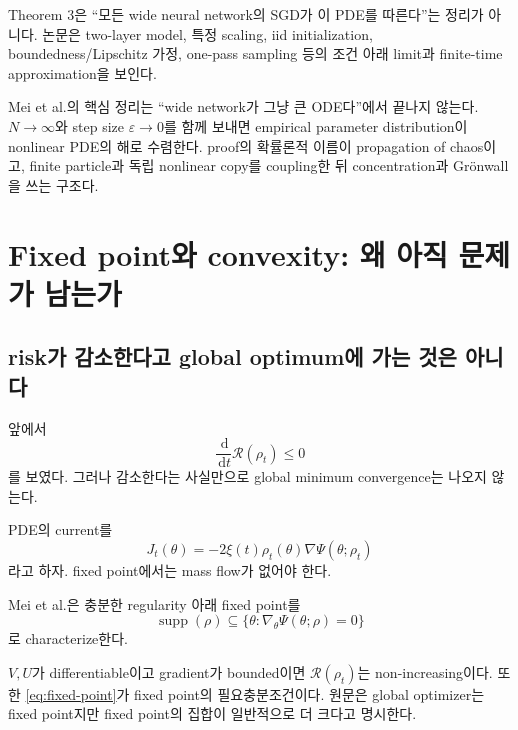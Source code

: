 \documentclass[11pt,a4paper,oneside,openany]{memoir}
\newcommand{\Risk}{\mathcal{R}}
\newcommand{\grad}{\nabla}
\newcommand{\dd}{\,\mathrm{d}}
\newcommand{\supp}{\operatorname{supp}}
\theoremstyle{definition}
\begin{document}
\begin{warningbox}
Theorem 3은 ``모든 wide neural network의 SGD가 이 PDE를 따른다''는 정리가 아니다.
논문은 two-layer model, 특정 scaling, iid initialization, boundedness/Lipschitz 가정, one-pass sampling 등의
조건 아래 limit과 finite-time approximation을 보인다.
\end{warningbox}

\begin{presentbox}
Mei et al.의 핵심 정리는 ``wide network가 그냥 큰 ODE다''에서 끝나지 않는다.
$N\to\infty$와 step size $\varepsilon\to0$를 함께 보내면 empirical parameter distribution이
nonlinear PDE의 해로 수렴한다. proof의 확률론적 이름이 propagation of chaos이고,
finite particle과 독립 nonlinear copy를 coupling한 뒤 concentration과 Grönwall을 쓰는 구조다.
\end{presentbox}

\chapter{Fixed point와 convexity: 왜 아직 문제가 남는가}

\section{risk가 감소한다고 global optimum에 가는 것은 아니다}

앞에서
\[
  \frac{\dd}{\dd t}\Risk(\rho_t)\le0
\]
를 보였다. 그러나 감소한다는 사실만으로 global minimum convergence는 나오지 않는다.

PDE의 current를
\[
  J_t(\theta)
  =-2\xi(t)\rho_t(\theta)\grad\Psi(\theta;\rho_t)
\]
라고 하자. fixed point에서는 mass flow가 없어야 한다.

Mei et al.은 충분한 regularity 아래 fixed point를
\begin{equation}
\boxed{
\supp(\rho)
\subseteq
\{\theta:\grad_\theta\Psi(\theta;\rho)=0\}
}
\label{eq:fixed-point}
\end{equation}
로 characterize한다.

\begin{paperbox}
$V,U$가 differentiable이고 gradient가 bounded이면 $\Risk(\rho_t)$는 non-increasing이다.
또한 \eqref{eq:fixed-point}가 fixed point의 필요충분조건이다.
원문은 global optimizer는 fixed point지만 fixed point의 집합이 일반적으로 더 크다고 명시한다.
\end{paperbox}
\end{document}
